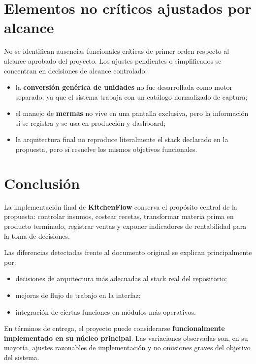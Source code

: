 \documentclass[12pt,letterpaper]{article}
\begin{document}
\section{Elementos no críticos ajustados por alcance}
No se identifican ausencias funcionales críticas de primer orden respecto al alcance aprobado del proyecto. Los ajustes pendientes o simplificados se concentran en decisiones de alcance controlado:

\begin{itemize}
	\item la \textbf{conversión genérica de unidades} no fue desarrollada como motor separado, ya que el sistema trabaja con un catálogo normalizado de captura;
	\item el manejo de \textbf{mermas} no vive en una pantalla exclusiva, pero la información sí se registra y se usa en producción y dashboard;
	\item la arquitectura final no reproduce literalmente el stack declarado en la propuesta, pero sí resuelve los mismos objetivos funcionales.
\end{itemize}

\section{Conclusión}
La implementación final de \textbf{KitchenFlow} conserva el propósito central de la propuesta: controlar insumos, costear recetas, transformar materia prima en producto terminado, registrar ventas y exponer indicadores de rentabilidad para la toma de decisiones.

Las diferencias detectadas frente al documento original se explican principalmente por:
\begin{itemize}
	\item decisiones de arquitectura más adecuadas al stack real del repositorio;
	\item mejoras de flujo de trabajo en la interfaz;
	\item integración de ciertas funciones en módulos más operativos.
\end{itemize}

En términos de entrega, el proyecto puede considerarse \textbf{funcionalmente implementado en su núcleo principal}. Las variaciones observadas son, en su mayoría, ajustes razonables de implementación y no omisiones graves del objetivo del sistema.
\end{document}
